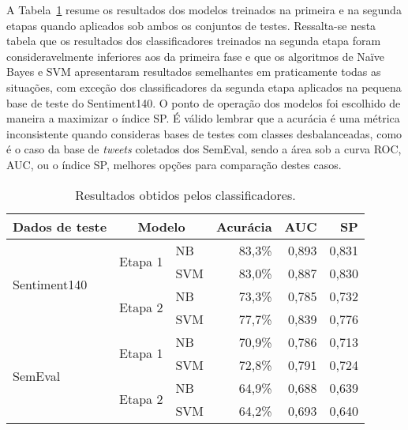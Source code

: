 A Tabela~\ref{tab:linear_perf} resume os resultados dos modelos treinados na primeira e na segunda etapas quando
aplicados sob ambos os conjuntos de testes.
Ressalta-se nesta tabela que os resultados dos classificadores treinados na segunda etapa foram consideravelmente
inferiores aos da primeira fase e que os algoritmos de Naïve Bayes e SVM apresentaram resultados semelhantes em
praticamente todas as situações, com exceção dos classificadores da segunda etapa aplicados na pequena base de teste
do Sentiment140.
O ponto de operação dos modelos foi escolhido de maneira a maximizar o índice SP.
É válido lembrar que a acurácia é uma métrica inconsistente quando consideras bases de testes com classes
desbalanceadas, como é o caso da base de \textit{tweets} coletados dos SemEval, sendo a área sob a curva ROC, AUC, ou o
índice SP, melhores opções para comparação destes casos.

\begin{table}[h]
    \begin{center}
        \begin{tabular}{ |l|l|l|r|r|r| }
            \hline
            \textbf{Dados de teste} & \multicolumn{2}{|c|}{\textbf{Modelo}}  & \textbf{Acurácia} & \textbf{AUC} & \textbf{SP} \\ \hline
            \multirow{4}{*}{Sentiment140} & \multirow{2}{*}{Etapa 1} & NB  & 83,3\% & 0,893 & 0,831 \\ \cline{3-6}
                                          &                          & SVM & 83,0\% & 0,887 & 0,830 \\ \cline{2-6}
                                          & \multirow{2}{*}{Etapa 2} & NB  & 73,3\% & 0,785 & 0,732 \\ \cline{3-6}
                                          &                          & SVM & 77,7\% & 0,839 & 0,776 \\ \hline
            \multirow{4}{*}{SemEval}      & \multirow{2}{*}{Etapa 1} & NB  & 70,9\% & 0,786 & 0,713 \\ \cline{3-6}
                                          &                          & SVM & 72,8\% & 0,791 & 0,724 \\ \cline{2-6}
                                          & \multirow{2}{*}{Etapa 2} & NB  & 64,9\% & 0,688 & 0,639 \\ \cline{3-6}
                                          &                          & SVM & 64,2\% & 0,693 & 0,640 \\ \hline
        \end{tabular}
        \caption{Resultados obtidos pelos classificadores.}
        \label{tab:linear_perf}
    \end{center}
\end{table}

